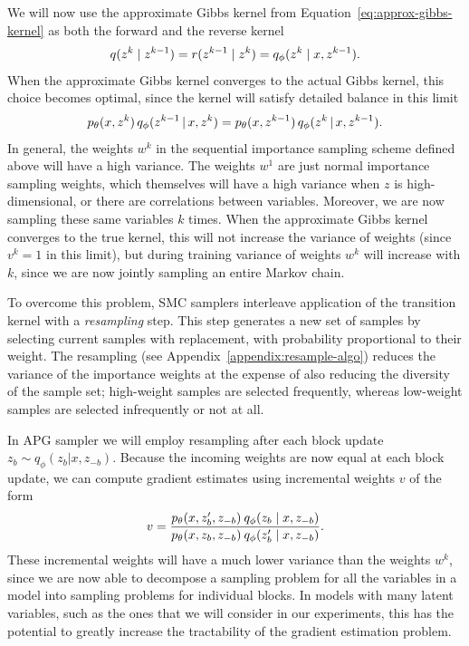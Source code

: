 \documentclass{article}
\theoremstyle{definition}
\begin{document}
We will now use the approximate Gibbs kernel from Equation~\ref{eq:approx-gibbs-kernel} as both the forward and the reverse kernel
\begin{align}
    q(z^{k} \mid  z^{k-1}) = r(z^{k-1} \mid  z^k) = q_\phi(z^k \mid x, z^{k-1}).
\end{align}
When the approximate Gibbs kernel converges to the actual Gibbs kernel, this choice becomes optimal, since the kernel will satisfy detailed balance in this limit
\begin{align*}
    p_\theta(x, z^k) 
    \,
    q_\phi(z^{k-1} \,|\, x, z^{k})
    =
    p_\theta(x, z^{k-1}) 
    \,
    q_\phi(z^{k} \,|\, x, z^{k-1}).
\end{align*}
In general, the weights $w^k$ in the sequential importance sampling scheme defined above will have a high variance. The weights $w^1$ are just normal importance sampling weights, which themselves will have a high variance when $z$ is high-dimensional, or there are correlations between variables. Moreover, we are now sampling these same variables $k$ times. When the approximate Gibbs kernel converges to the true kernel, this will not increase the variance of weights (since $v^k=1$ in this limit), but during training variance of weights $w^k$ will increase with $k$, since we are now jointly sampling an entire Markov chain.

To overcome this problem, SMC samplers interleave application of the transition kernel with a \emph{resampling} step. This step generates a new set of samples by selecting current samples with replacement, with probability proportional to their weight.
The resampling (see Appendix~\ref{appendix:resample-algo}) reduces the variance of the importance weights at the expense of also reducing the diversity of the sample set; high-weight samples are selected frequently, whereas low-weight samples are selected infrequently or not at all.

In APG sampler we will employ resampling after each block update $z_b\sim q_\phi(z_b | x, z_{-b})$. Because the incoming weights are now equal at each block update, we can compute gradient estimates using incremental weights $v$ of the form
\begin{align}
    v
    = 
    \frac{p_\theta(x, z'_b, z_{-b}) \: q_\phi(z_b \mid  x, z_{-b})}
         {p_\theta(x, z_b, z_{-b}) \: q_\phi(z'_b \mid  x, z_{-b})}
    .
\end{align}
These incremental weights will have a much lower variance than the weights $w^k$, since we are now able to decompose a sampling problem for all the variables in a model into sampling problems for individual blocks. In models with many latent variables, such as the ones that we will consider in our experiments, this has the potential to greatly increase the tractability of the gradient estimation problem. 
\end{document}
